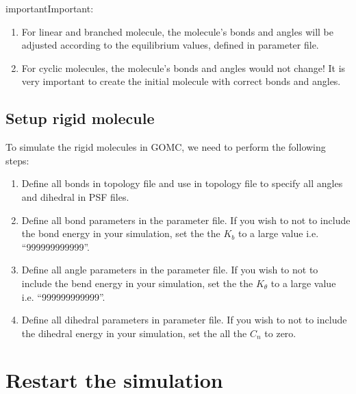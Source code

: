 \documentclass[letterpaper,10pt,english]{sphinxmanual}
\begin{document}
\begin{sphinxadmonition}{important}{Important:}\begin{enumerate}
%
\item {} 
\sphinxAtStartPar
For linear and branched molecule, the molecule’s bonds and angles  will be adjusted according to the equilibrium values, defined in parameter file.

\item {} 
\sphinxAtStartPar
For cyclic molecules, the molecule’s bonds and angles would not change! It is very important to create the initial molecule with correct bonds and angles.

\end{enumerate}
\end{sphinxadmonition}


\subsection{Setup rigid  molecule}
\label{\detokenize{howto:setup-rigid-molecule}}
\sphinxAtStartPar
To simulate the rigid molecules in GOMC, we need to perform the following steps:
\begin{enumerate}
%
\item {} 
\sphinxAtStartPar
Define all bonds in topology file and use  in topology file to specify all angles and dihedral in PSF files.

\item {} 
\sphinxAtStartPar
Define all bond parameters in the parameter file. If you wish to not to include the bond energy in your simulation, set the
the \(K_b\) to a large value i.e. “999999999999”.

\item {} 
\sphinxAtStartPar
Define all angle parameters in the parameter file. If you wish to not to include the bend energy in your simulation, set the
the \(K_{\theta}\) to a large value i.e. “999999999999”.

\item {} 
\sphinxAtStartPar
Define all dihedral parameters in parameter file. If you wish to not to include the dihedral energy in your simulation, set the all
the \(C_n\) to zero. 

\end{enumerate}


\section{Restart the simulation}
\label{\detokenize{howto:restart-the-simulation}}
\end{document}
